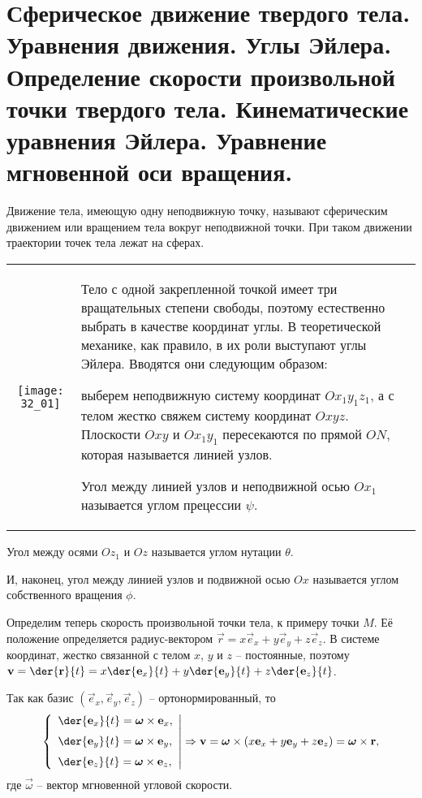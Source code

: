 \chapter{Сферическое движение твердого тела. Уравнения движения. Углы Эйлера.
Определение скорости произвольной точки твердого тела. Кинематические
уравнения Эйлера. Уравнение мгновенной оси вращения.}
Движение тела, имеющую одну неподвижную точку, называют сферическим движением
или вращением тела вокруг неподвижной точки. При таком движении траектории точек
тела лежат на сферах.

\begin{table}[h!]
    \vspace*{-1em}
    \begin{tabular}{C{.4}m{.55\textwidth}}
        \texttt{[image: 32\_01]} &
        Тело с одной закрепленной точкой имеет три вращательных степени свободы,
        поэтому естественно выбрать в качестве координат углы. В теоретической
        механике, как правило, в их роли выступают углы Эйлера. Вводятся они
        следующим образом:

        выберем неподвижную систему координат \( Ox_1y_1z_1 \), а с телом жестко
        свяжем систему координат \( Oxyz \). Плоскости \( Oxy \) и \( Ox_1y_1 \)
        пересекаются по прямой \( ON \), которая называется линией узлов.

        Угол между линией узлов и неподвижной осью \( Ox_1 \) называется углом
        прецессии \( \psi \).
    \end{tabular}
    \vspace*{-1em}
\end{table}
Угол между осями \( Oz_1 \) и \( Oz \) называется углом нутации \( \theta \).

И, наконец,
угол между линией узлов и подвижной осью \( Ox \) называется углом собственного
вращения \( \phi \).

Определим теперь скорость произвольной точки тела, к примеру точки \( M \). Её
положение определяется радиус-вектором \( \vec{r} = x\vec{e}_x + y\vec{e}_y +
z\vec{e}_z \). В системе координат, жестко связанной с телом \( x \), \( y \) и
\( z \) -- постоянные, поэтому
\( \ds \vec{v} = \der{\vec{r}}{t} = x\der{\vec{e}_x}{t} + y\der{\vec{e}_y}{t} +
z\der{\vec{e}_z}{t} \).

Так как базис \( (\vec{e}_x, \vec{e}_y, \vec{e}_z) \) -- ортонормированный, то
\[
    \left\{ \begin{array}{l}
        \ds\der{\vec{e}_x}{t} = \vec{\omega}\times\vec{e}_x, \\[.6em]
        \ds\der{\vec{e}_y}{t} = \vec{\omega}\times\vec{e}_y, \\[.6em]
        \ds\der{\vec{e}_z}{t} = \vec{\omega}\times\vec{e}_z,
    \end{array} \right| \Rightarrow
    \vec{v} = \vec{\omega}\times(x\vec{e}_x + y\vec{e}_y + z\vec{e}_z) =
    \vec{\omega}\times\vec{r},
\]
где \( \vec{\omega} \) -- вектор мгновенной угловой скорости.


